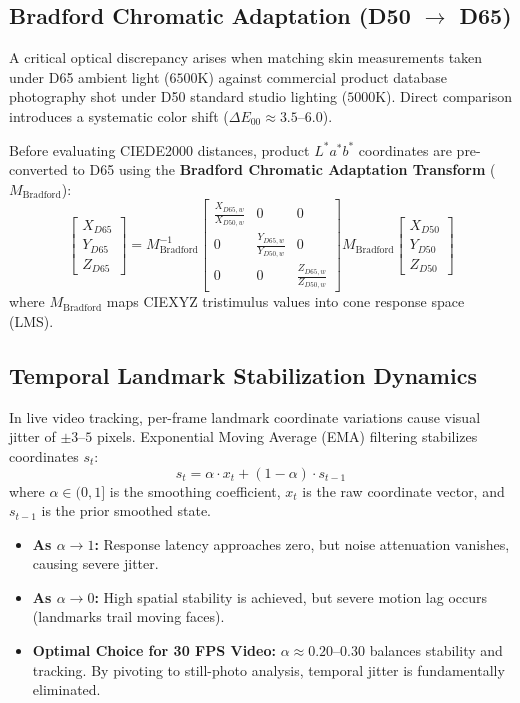 \documentclass[conference]{IEEEtran}
\begin{document}
\subsection{Bradford Chromatic Adaptation (D50 $\rightarrow$ D65)}
A critical optical discrepancy arises when matching skin measurements taken under D65 ambient light ($6500\text{K}$) against commercial product database photography shot under D50 standard studio lighting ($5000\text{K}$). Direct comparison introduces a systematic color shift ($\Delta E_{00} \approx 3.5\text{--}6.0$).

Before evaluating CIEDE2000 distances, product $L^*a^*b^*$ coordinates are pre-converted to D65 using the \textbf{Bradford Chromatic Adaptation Transform} ($M_{\text{Bradford}}$):
\begin{equation}
\begin{bmatrix} X_{D65} \\ Y_{D65} \\ Z_{D65} \end{bmatrix} = M_{\text{Bradford}}^{-1} \begin{bmatrix} \frac{X_{D65, w}}{X_{D50, w}} & 0 & 0 \\ 0 & \frac{Y_{D65, w}}{Y_{D50, w}} & 0 \\ 0 & 0 & \frac{Z_{D65, w}}{Z_{D50, w}} \end{bmatrix} M_{\text{Bradford}} \begin{bmatrix} X_{D50} \\ Y_{D50} \\ Z_{D50} \end{bmatrix}
\end{equation}
where $M_{\text{Bradford}}$ maps CIEXYZ tristimulus values into cone response space (LMS).

\subsection{Temporal Landmark Stabilization Dynamics}
In live video tracking, per-frame landmark coordinate variations cause visual jitter of $\pm 3$--$5$ pixels. Exponential Moving Average (EMA) filtering stabilizes coordinates $s_t$:
\begin{equation}
s_t = \alpha \cdot x_t + (1 - \alpha) \cdot s_{t-1}
\label{eq:ema}
\end{equation}
where $\alpha \in (0, 1]$ is the smoothing coefficient, $x_t$ is the raw coordinate vector, and $s_{t-1}$ is the prior smoothed state.

\begin{itemize}
    \item \textbf{As $\alpha \to 1$:} Response latency approaches zero, but noise attenuation vanishes, causing severe jitter.
    \item \textbf{As $\alpha \to 0$:} High spatial stability is achieved, but severe motion lag occurs (landmarks trail moving faces).
    \item \textbf{Optimal Choice for 30 FPS Video:} $\alpha \approx 0.20$--$0.30$ balances stability and tracking. By pivoting to still-photo analysis, temporal jitter is fundamentally eliminated.
\end{itemize}
\end{document}
